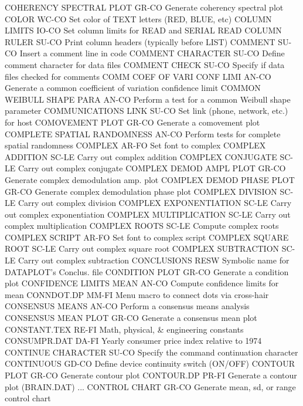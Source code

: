 COHERENCY SPECTRAL PLOT     GR-CO Generate coherency spectral plot
COLOR                       WC-CO Set color of TEXT letters (RED, BLUE, etc)
COLUMN LIMITS               IO-CO Set column limits for READ and SERIAL READ
COLUMN RULER                SU-CO Print column headers (typically before LIST)
COMMENT                     SU-CO Insert a comment line in code
COMMENT CHARACTER           SU-CO Define comment character for data files
COMMENT CHECK               SU-CO Specify if data files checked for comments
COMM COEF OF VARI CONF LIMI AN-CO Generate a common coefficient of variation confidence limit
COMMON WEIBULL SHAPE PARA   AN-CO Perform a test for a common Weibull shape parameter
COMMUNICATIONS LINK         SU-CO Set link (phone, network, etc.) for host
COMOVEMENT PLOT             GR-CO Generate a comovement plot
COMPLETE SPATIAL RANDOMNESS AN-CO Perform tests for complete spatial randomness
COMPLEX                     AR-FO Set font to complex
COMPLEX ADDITION            SC-LE Carry out complex addition
COMPLEX CONJUGATE           SC-LE Carry out complex conjugate
COMPLEX DEMOD AMPL PLOT     GR-CO Generate complex demodulation amp. plot
COMPLEX DEMOD PHASE PLOT    GR-CO Generate complex demodulation phase plot
COMPLEX DIVISION            SC-LE Carry out complex division
COMPLEX EXPONENTIATION      SC-LE Carry out complex exponentiation
COMPLEX MULTIPLICATION      SC-LE Carry out complex multiplication
COMPLEX ROOTS               SC-LE Compute complex roots
COMPLEX SCRIPT              AR-FO Set font to complex script
COMPLEX SQUARE ROOT         SC-LE Carry out complex square root
COMPLEX SUBTRACTION         SC-LE Carry out complex subtraction
CONCLUSIONS                 RESW  Symbolic name for DATAPLOT's Conclus. file
CONDITION PLOT              GR-CO Generate a condition plot
CONFIDENCE LIMITS MEAN      AN-CO Compute confidence limits for mean
CONNDOT.DP                  MM-FI Menu macro to connect dots via cross-hair
CONSENSUS MEANS             AN-CO Perform a consensus means analysis
CONSENSUS MEAN PLOT         GR-CO Generate a consensus mean plot
CONSTANT.TEX                RE-FI Math, physical, & engineering constants
CONSUMPR.DAT                DA-FI Yearly consumer price index relative to 1974
CONTINUE CHARACTER          SU-CO Specify the command continuation character
CONTINUOUS                  GD-CO Define device continuity switch (ON/OFF)
CONTOUR PLOT                GR-CO Generate contour plot
CONTOUR.DP                  PR-FI Generate a contour plot (BRAIN.DAT)
... CONTROL CHART           GR-CO Generate mean, sd, or range control chart
